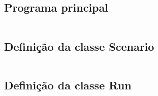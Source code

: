\documentclass[a4paper, portuguese]{report}
\begin{document}
    \subsection{Programa principal}\label{subsec:programa-principal}
    \inputminted[breaklines]{python}{../src/main.py}

    \subsection{Definição da classe Scenario}\label{subsec:definicao-da-classe-scenario}
    \inputminted[breaklines]{python}{../src/forestfire/scenario.py}

    \subsection{Definição da classe Run}\label{subsec:definicao-da-classe-run}
    \inputminted[breaklines]{python}{../src/forestfire/run.py}

    
    
\end{document}

